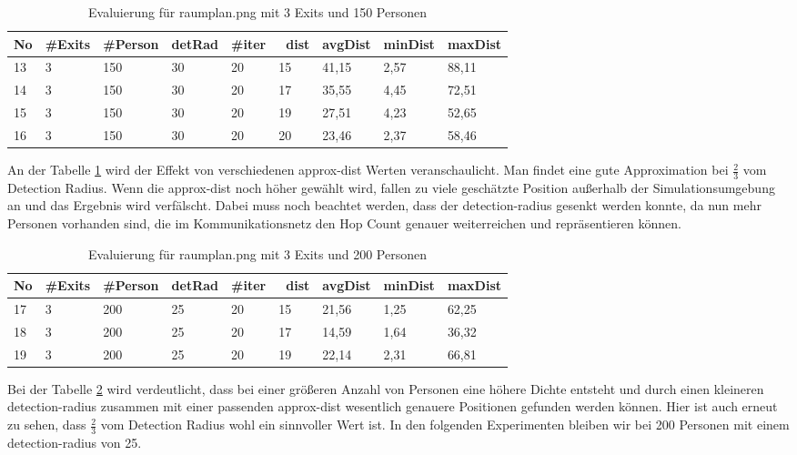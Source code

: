 \begin{table}[h]
\begin{tabular}{|l|l|l|l|l|l|l|l|l|}
\hline
No & \#Exits & \#Person & detRad & \#iter & ~dist & avgDist & minDist & maxDist \\ \hline
13 & 3       & 150      & 30     & 20     & 15    & 41,15   & 2,57    & 88,11   \\ \hline
14 & 3       & 150      & 30     & 20     & 17    & 35,55   & 4,45    & 72,51   \\ \hline
15 & 3       & 150      & 30     & 20     & 19    & 27,51   & 4,23    & 52,65   \\ \hline
16 & 3       & 150      & 30     & 20     & 20    & 23,46   & 2,37    & 58,46   \\ \hline
\end{tabular}
\caption{Evaluierung für raumplan.png mit 3 Exits und 150 Personen}
\label{fig:eva02}
\end{table}

An der Tabelle \ref{fig:eva02} wird der Effekt von verschiedenen approx-dist Werten veranschaulicht. Man findet eine gute Approximation bei \( \frac{2}{3} \) vom Detection Radius. Wenn die approx-dist noch höher gewählt wird, fallen zu viele geschätzte Position außerhalb der Simulationsumgebung an und das Ergebnis wird verfälscht. Dabei muss noch beachtet werden, dass der detection-radius gesenkt werden konnte, da nun mehr Personen vorhanden sind, die im Kommunikationsnetz den Hop Count genauer weiterreichen und repräsentieren können.


\begin{table}[h]
\begin{tabular}{|l|l|l|l|l|l|l|l|l|}
\hline
No & \#Exits & \#Person & detRad & \#iter & ~dist & avgDist & minDist & maxDist \\ \hline
17 & 3       & 200      & 25     & 20     & 15    & 21,56   & 1,25    & 62,25   \\ \hline
18 & 3       & 200      & 25     & 20     & 17    & 14,59   & 1,64    & 36,32   \\ \hline
19 & 3       & 200      & 25     & 20     & 19    & 22,14   & 2,31    & 66,81   \\ \hline
\end{tabular}
\caption{Evaluierung für raumplan.png mit 3 Exits und 200 Personen}
\label{fig:eva03}
\end{table}

Bei der Tabelle \ref{fig:eva03} wird verdeutlicht, dass bei einer größeren Anzahl von Personen eine höhere Dichte entsteht und durch einen kleineren detection-radius zusammen mit einer passenden approx-dist wesentlich genauere Positionen gefunden werden können. Hier ist auch erneut zu sehen, dass \( \frac{2}{3} \) vom Detection Radius wohl ein sinnvoller Wert ist. In den folgenden Experimenten bleiben wir bei 200 Personen mit einem detection-radius von 25.

